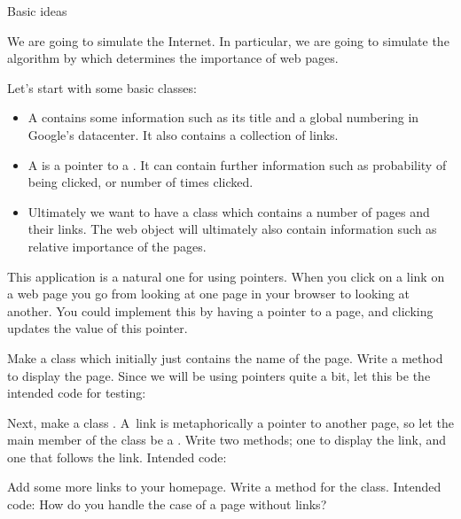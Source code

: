 
 {Basic ideas}

We are going to simulate the Internet. In particular, we are going to
simulate the  algorithm by which
 determines the importance of web pages.

Let's start with some basic classes: 
\begin{itemize}
\item A  contains some information such as its title and a
  global numbering in Google's datacenter. It also contains a
  collection of links.
\item A  is a pointer to a . It can contain further
  information such as probability of being clicked, or number of times
  clicked.
\item Ultimately we want to have a class  which contains a
  number of pages and their links. The web object will ultimately also
  contain information such as relative importance of the pages.
\end{itemize}

This application is a natural one for using pointers. When you click
on a link on a web page you go from looking at one page in your
browser to looking at another. You could implement this by having a
pointer to a page, and clicking updates the value of this pointer.

\begin{exercise}
  Make a class  which initially just contains the name of the
  page. Write a method to display the page. Since we will be using
  pointers quite a bit, let this be the intended code for testing:

  Next, make a class . A~link is metaphorically a pointer to
  another page, so let the main member of the  class be a
  . Write two methods; one to display the link,
  and one  that follows the link. Intended code:
\end{exercise}

\begin{exercise}
  Add some more links to your homepage. Write a method
   for the  class. Intended code:
  How do you handle the case of a page without links?
\end{exercise}

